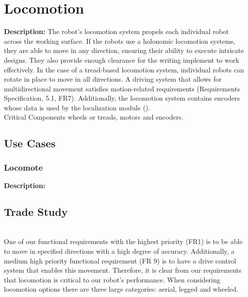 
\section{Locomotion}
\label{sec:locomotion}

\textbf{Description:} The robot's locomotion system propels each individual robot across the working surface. If the robots use a holonomic locomotion systems, they are able to move in any direction, ensuring their ability to execute intricate designs. They also provide enough clearance for the writing implement to work effectively. In the case of a tread-based locomotion system, individual robots can rotate in place to move in all directions. A driving system that allows for multidirectional movement satisfies motion-related requirements (Requirements Specification, 5.1, FR7). Additionally, the locomotion system contains encoders whose data is used by the localization module (). \\
Critical Components  wheels or treads, motors and encoders.  \\


\subsection{Use Cases}
\subsubsection{Locomote}
\textbf{Description:} 

\subsection{Trade Study}
\label{sec:trade_locomotion}
 \\
One of our functional requirements with the highest priority (FR1) is to be able to move in specified directions with a high degree of accuracy. Additionally, a medium high priority functional requirement (FR 9) is to have a drive control system that enables this movement. Therefore, it is clear from our requirements that locomotion is critical to our robot's performance. When considering locomotion options there are three large categories: aerial, legged and wheeled. 


